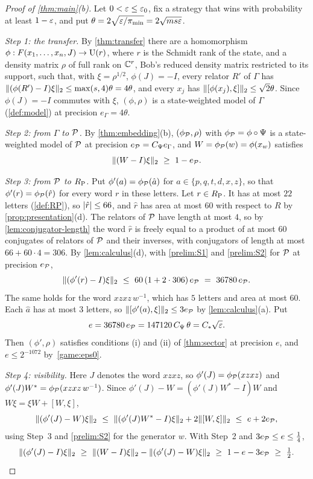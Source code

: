 \begin{proof}[Proof of \cref{thm:main}(b)]
Let $0<\varepsilon\le\varepsilon_0$, fix a strategy that wins with probability at least $1-\varepsilon$, and put $\theta=2\sqrt{\varepsilon/\pi_{\min}}=2\sqrt{ms\varepsilon}$.

\emph{Step 1: the transfer.} By \cref{thm:transfer} there are a homomorphism $\phi:F(x_1,\dots,x_n,J)\to\mathrm U(r)$, where $r$ is the Schmidt
rank of the state, and a density matrix $\rho$ of full rank on $\mathbb C^r$, Bob's reduced density matrix restricted to its support, such that,
with $\xi=\rho^{1/2}$, $\phi(J)=-I$, every relator $R'$ of $\Gamma$ has $\lVert (\phi(R')-I)\xi\rVert_2\le\max(s,4)\theta=4\theta$, and every $x_j$ has
$\lVert [\phi(x_j),\xi]\rVert_2\le\sqrt2\theta$. Since $\phi(J)=-I$ commutes with $\xi$, $(\phi,\rho)$ is a state-weighted model of $\Gamma$
(\cref{def:model}) at precision $e_\Gamma=4\theta$.

\emph{Step 2: from $\Gamma$ to $\mathcal P$.} By \cref{thm:embedding}(b), $(\phi_\mathcal P,\rho)$ with $\phi_\mathcal P=\phi\circ\Psi$ is a state-weighted model
of $\mathcal P$ at precision $e_\mathcal P=C_\Psi e_\Gamma$, and $W=\phi_\mathcal P(w)=\phi(x_w)$ satisfies
\[
\lVert (W-I)\xi\rVert_2\ \ge\ 1-e_\mathcal P .
\]

\emph{Step 3: from $\mathcal P$ to $R_{\mathrm P}$.} Put $\phi'(a)=\phi_\mathcal P(\hat a)$ for $a\in\{p,q,t,d,x,z\}$, so that $\phi'(r)=\phi_\mathcal P(\hat r)$ for every
word $r$ in these letters. Let $r\in R_{\mathrm P}$. It has at most $22$ letters (\cref{def:RP}), so $\lvert \hat r\rvert\le66$, and $\hat r$ has area at most
$60$ with respect to $R$ by \cref{prop:presentation}(d). The relators of $\mathcal P$ have length at most $4$, so by \cref{lem:conjugator-length}
the word $\hat r$ is freely equal to a product of at most $60$ conjugates of relators of $\mathcal P$ and their inverses, with conjugators of length
at most $66+60\cdot4=306$. By \cref{lem:calculus}(d), with \ref{prelim:S1} and \ref{prelim:S2} for $\mathcal P$ at precision $e_\mathcal P$,
\[
\hs{(\phi'(r)-I)\xi}\ \le\ 60\,(1+2\cdot306)\,e_\Pres\ =\ 36780\,e_\Pres .
\]
The same holds for the word $xzxz\,w^{-1}$, which has $5$ letters and area at most $60$. Each $\hat a$ has at most $3$ letters, so
$\lVert [\phi'(a),\xi]\rVert_2\le3e_\mathcal P$ by \cref{lem:calculus}(a). Put
\[
e=36780\,e_\mathcal P=147120\,C_\Psi\,\theta=C_*\sqrt{\varepsilon} .
\]
Then $(\phi',\rho)$ satisfies conditions (i) and (ii) of \cref{thm:sector} at precision $e$, and $e\le2^{-1072}$ by~\eqref{game:eps0}.

\emph{Step 4: visibility.} Here $J$ denotes the word $xzxz$, so $\phi'(J)=\phi_\mathcal P(xzxz)$ and $\phi'(J)W^*=\phi_\mathcal P(xzxz\,w^{-1})$.
Since $\phi'(J)-W=(\phi'(J)W^*-I)W$ and $W\xi=\xi W+[W,\xi]$,
\[
\hs{(\phi'(J)-W)\xi}\ \le\ \hs{(\phi'(J)W^*-I)\xi}+2\hs{[W,\xi]}\ \le\ e+2e_\Pres ,
\]
using Step~3 and \ref{prelim:S2} for the generator $w$. With Step~2 and $3e_\mathcal P\le e\le\frac14$,
\[
\hs{(\phi'(J)-I)\xi}\ \ge\ \hs{(W-I)\xi}-\hs{(\phi'(J)-W)\xi}\ \ge\ 1-e-3e_\Pres\ \ge\ \tfrac12 .
\]


\end{proof}
